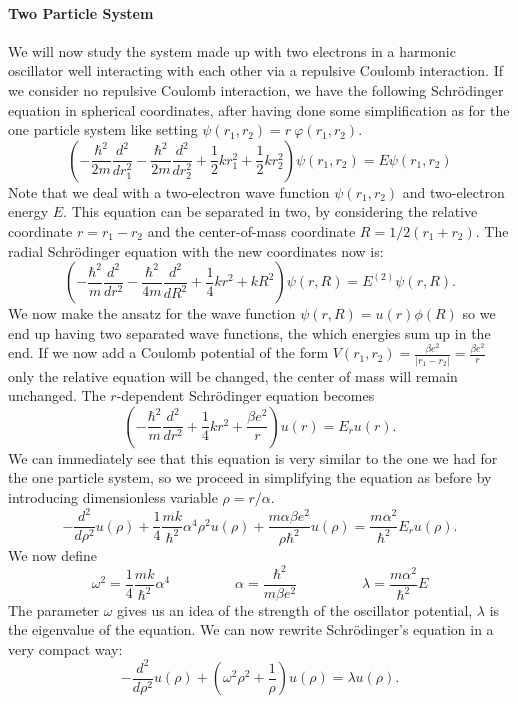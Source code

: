 \documentclass[10pt,a4paper,titlepage]{article}
\begin{document}
\paragraph*{Two Particle System}
We will now study the system made up with two electrons in a harmonic oscillator well interacting with each other via a repulsive Coulomb interaction.
If we consider no repulsive Coulomb interaction, we have the following Schr\"odinger equation in spherical coordinates, after having done some 
simplification as for the one particle system like setting $\psi(r_1, r_2) = r~\varphi (r_1, r_2)$.
\begin{equation}
\left(  -\frac{\hbar^2}{2 m} \frac{d^2}{dr_1^2} -\frac{\hbar^2}{2 m} \frac{d^2}{dr_2^2}+ \frac{1}{2}k r_1^2+ \frac{1}{2}k r_2^2\right)\psi(r_1,r_2) 
	 = E \psi(r_1,r_2) 
\end{equation}
\noindent Note that we deal with a two-electron wave function $\psi(r_1,r_2)$ and two-electron energy $E$. This equation can be separated in two, by 
considering the relative coordinate $r = r_1 - r_2$ and the center-of-mass coordinate $ R = 1/2(r_1+r_2)$.
The radial Schr\"odinger equation with the new coordinates now is:
\begin{equation}
\left(  -\frac{\hbar^2}{m} \frac{d^2}{dr^2} -\frac{\hbar^2}{4 m} \frac{d^2}{dR^2}+ \frac{1}{4} k r^2+  kR^2\right)\psi(r,R)  = E^{(2)} \psi(r,R).
\end{equation}
We now make the ansatz for the wave function $\psi(r,R) = u(r)\phi(R)$ so we end up having two separated wave functions, the which energies sum up in 
the end. If we now add a Coulomb potential of the form $V(r_1,r_2) = \frac{\beta e^2}{|r_1-r_2|}=\frac{\beta e^2}{r}$  only the relative 
equation will be changed, the center of mass will remain unchanged. 
The $r$-dependent Schr\"odinger equation becomes
\begin{equation}
\left(  -\frac{\hbar^2}{m} \frac{d^2}{dr^2}+ \frac{1}{4}k r^2+\frac{\beta e^2}{r}\right)u(r)  = E_r u(r).
\end{equation}
We can immediately see that this equation is very similar to the one we had for the one particle system, so we proceed in simplifying the equation as 
before by introducing dimensionless variable $\rho = r/\alpha$.  
\begin{equation}
  -\frac{d^2}{d\rho^2} u(\rho) 
       + \frac{1}{4}\frac{mk}{\hbar^2} \alpha^4\rho^2u(\rho)+\frac{m\alpha \beta e^2}{\rho\hbar^2}u(\rho)  = 
\frac{m\alpha^2}{\hbar^2}E_r u(\rho) .
\end{equation}
We now define 
\[
\omega^2=\frac{1}{4}\frac{mk}{\hbar^2} \alpha^4  ~~~~~~~~~~~~~~~~~~~~~ \alpha = \frac{\hbar^2}{m\beta e^2} ~~~~~~~~~~~~~~~~~~~~~
\lambda = \frac{m\alpha^2}{\hbar^2}E
\]
The parameter $\omega$ gives us an idea of the strength of the oscillator potential, $\lambda$ is the eigenvalue of the equation. We can now rewrite 
Schr\"odinger's equation in a very compact way:
\begin{equation}
  -\frac{d^2}{d\rho^2} u(\rho) + \left(\omega^2\rho^2 +\frac{1}{\rho} \right) u(\rho) = \lambda u(\rho).
\end{equation}
\end{document}
